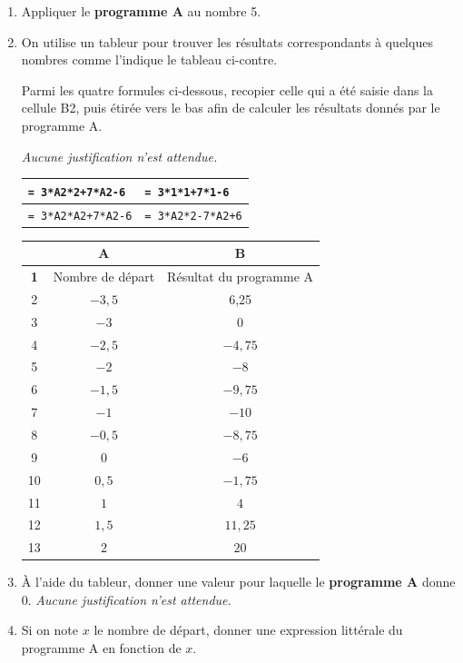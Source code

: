 \documentclass[exercice]{thedocument}%
\begin{document}
    \begin{enumerate}
        \item Appliquer le \textbf{programme A} au nombre 5.

        \item On utilise un tableur pour trouver les résultats correspondants à quelques nombres comme l'indique le tableau ci-contre.

        Parmi les quatre formules ci-dessous, recopier celle qui a été saisie dans la cellule B2, puis étirée vers le bas afin de calculer les résultats donnés par le programme A.

        \emph{Aucune justification n'est attendue.}

        \begin{center}
            \begin{tabular}{|l|l|}\hline
            \texttt{= 3*A2*2+7*A2-6} & \texttt{= 3*1*1+7*1-6} \\\hline
            \texttt{= 3*A2*A2+7*A2-6} & \texttt{= 3*A2*2-7*A2+6} \\\hline
            \end{tabular}
        \end{center}

        \begin{center}
            \begin{tabular}{|c|c|c|}
                \hline
                & \textbf{A} & \textbf{B} \\
                \hline
                \textbf{1} & Nombre de départ & Résultat du programme A \\
                \hline
                2 & $-3,5$ & 6,25 \\
                3 & $-3$ & 0 \\
                4 & $-2,5$ & $-4,75$ \\
                5 & $-2$ & $-8$ \\
                6 & $-1,5$ & $-9,75$ \\
                7 & $-1$ & $-10$ \\
                8 & $-0,5$ & $-8,75$ \\
                9 & $0$ & $-6$ \\
                10 & $0,5$ & $-1,75$ \\
                11 & $1$ & $4$ \\
                12 & $1,5$ & $11,25$ \\
                13 & $2$ & $20$ \\
                \hline
            \end{tabular}
        \end{center}

        \item \`A l'aide du tableur, donner une valeur pour laquelle le \textbf{programme A} donne 0. \textit{Aucune justification n'est attendue.}

        \item Si on note $x$ le nombre de départ, donner une expression littérale du programme A en fonction de $x$.
    \end{enumerate}
\end{document}
